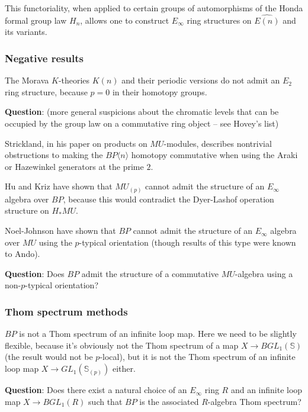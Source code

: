 \documentclass[12pt,titlepage]{article}
\theoremstyle{plain}
\theoremstyle{definition}
\theoremstyle{remark}
\begin{document}
This functoriality, when applied to certain groups of automorphisms of the Honda formal group law $H_n$, allows one to construct $E_\infty$ ring structures on $\widehat{E(n)}$ and its variants.

\hypertarget{negative_results_7}{}\subsubsection{{Negative results}}\label{negative_results_7}

The Morava $K$-theories $K(n)$ and their periodic versions do not admit an $E_2$ ring structure, because $p=0$ in their homotopy groups.

\textbf{Question}: (more general suspicions about the chromatic levels that can be occupied by the group law on a commutative ring object --{} see Hovey'{}s list)

Strickland, in his paper on products on $MU$-modules, describes nontrivial obstructions to making the $BP\langle n\rangle$ homotopy commutative when using the Araki or Hazewinkel generators at the prime $2$.

Hu and Kriz have shown that $MU_{(p)}$ cannot admit the structure of an $E_\infty$ algebra over $BP$, because this would contradict the Dyer-Lashof operation structure on $H_* MU$.

Noel-Johnson have shown that $BP$ cannot admit the structure of an $E_\infty$ algebra over $MU$ using the $p$-typical orientation (though results of this type were known to Ando).

\textbf{Question}: Does $BP$ admit the structure of a commutative $MU$-algebra using a non-$p$-typical orientation?

\hypertarget{thom_spectrum_methods_8}{}\subsubsection{{Thom spectrum methods}}\label{thom_spectrum_methods_8}

$BP$ is not a Thom spectrum of an infinite loop map. Here we need to be slightly flexible, because it'{}s obviously not the Thom spectrum of a map $X \to BGL_1(\mathbb{S})$ (the result would not be $p$-local), but it is not the Thom spectrum of an infinite loop map $X \to GL_1(\mathbb{S}_{(p)})$ either.

\textbf{Question}: Does there exist a natural choice of an $E_\infty$ ring $R$ and an infinite loop map $X \to BGL_1(R)$ such that $BP$ is the associated $R$-algebra Thom spectrum?
\end{document}
